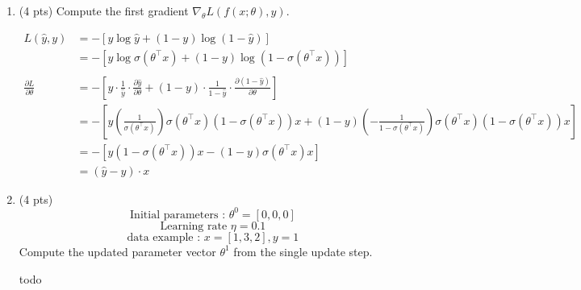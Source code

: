 \documentclass[a4paper]{article}
\theoremstyle{definition}
\newenvironment{soln}{
    \leavevmode\color{blue}\ignorespaces
}{}
\begin{document}
\begin{enumerate}
	      \begin{enumerate}
		      \item (4 pts) Compute the first gradient $\nabla_{\theta} L(f(x;\theta), y)$.

		            \begin{soln}
			            \begin{align*}
				            L(\hat{y}, y)                      & = -[y \log \hat{y} + (1 - y) \log(1 - \hat{y})]                                                                                                                                                                                                              \\
				                                               & = -[y \log \sigma(\theta^\top x) + (1 - y) \log(1 - \sigma(\theta^\top x))]                                                                                                                                                                                  \\\\
				            \frac{\partial L}{\partial \theta} & = -\left[y \cdot \frac{1}{\hat{y}} \cdot \frac{\partial \hat{y}}{\partial \theta} + (1-y) \cdot \frac{1}{1 - \hat{y}} \cdot \frac{\partial (1-\hat{y})}{\partial \theta}\right]                                                                              \\
				                                               & = -\left[y \left(\frac{1}{{\sigma(\theta^\top x)}}\right) \sigma(\theta^\top x) \left(1 - \sigma(\theta^\top x)\right) x + (1 - y) \left(-\frac{1}{{1 - \sigma(\theta^\top x)}}\right) \sigma(\theta^\top x) \left(1 - \sigma(\theta^\top x)\right) x\right] \\
				                                               & = -\left[y (1 - \sigma(\theta^\top x)) x - (1 - y) \sigma(\theta^\top x) x\right]                                                                                                                                                                            \\
				                                               & = (\hat{y} - y) \cdot x
			            \end{align*}
		            \end{soln}

		      \item (4 pts)
		            $$ \text{Initial parameters : }  \theta^{0}=[0, 0, 0]$$
		            $$ \text{Learning rate }\eta=0.1$$
		            $$ \text{data example : } x=[1, 3, 2], y=1$$
		            Compute the updated parameter vector $\theta^{1}$ from the single update step.

		            \begin{soln}
			            todo
		            \end{soln}

	      \end{enumerate}
\end{enumerate}
\end{document}
